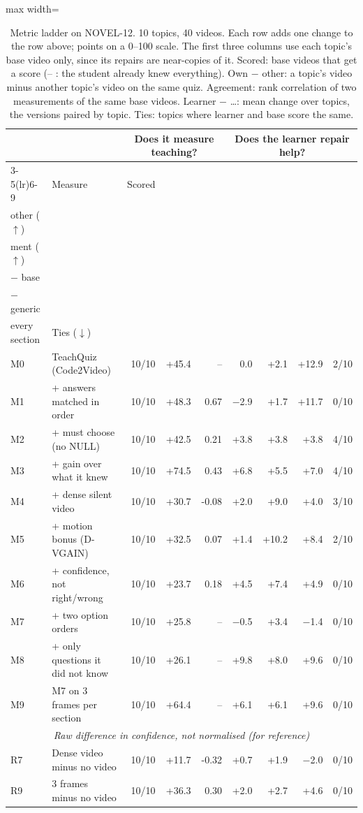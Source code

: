 \begin{table}[!tbp]\centering\footnotesize
\caption{Metric ladder on NOVEL-12. 10 topics, 40 videos. Each row adds one change to the row above; points on a 0--100 scale. The first three columns use each topic's base video only, since its repairs are near-copies of it. Scored: base videos that get a score (-- : the student already knew everything). Own $-$ other: a topic's video minus another topic's video on the same quiz. Agreement: rank correlation of two measurements of the same base videos. Learner $-$ \ldots: mean change over topics, the versions paired by topic. Ties: topics where learner and base score the same.}\label{tab:ladder_novel}
\setlength{\tabcolsep}{4pt}\begin{adjustbox}{max width=\linewidth}\begin{tabular}{@{}llrrrrrrr@{}}\toprule & & \multicolumn{3}{c}{Does it measure teaching?} & \multicolumn{4}{c}{Does the learner repair help?}\\
\cmidrule(lr){3-5}\cmidrule(lr){6-9}
& Measure & Scored & \hd{Own $-$\\other ($\uparrow$)} & \hd{Agree-\\ment ($\uparrow$)} & \hd{Learner\\$-$ base} & \hd{Learner\\$-$ generic} & \hd{Learner $-$\\every section} & Ties ($\downarrow$)\\\midrule
M0 & TeachQuiz (Code2Video) & 10/10 & +45.4 & -- & 0.0 & +2.1 & +12.9 & 2/10 \\
M1 & + answers matched in order & 10/10 & +48.3 & 0.67 & $-$2.9 & +1.7 & +11.7 & 0/10 \\
M2 & + must choose (no NULL) & 10/10 & +42.5 & 0.21 & +3.8 & +3.8 & +3.8 & 4/10 \\
M3 & + gain over what it knew & 10/10 & +74.5 & 0.43 & +6.8 & +5.5 & +7.0 & 4/10 \\
M4 & + dense silent video & 10/10 & +30.7 & -0.08 & +2.0 & +9.0 & +4.0 & 3/10 \\
M5 & + motion bonus (D-VGAIN) & 10/10 & +32.5 & 0.07 & +1.4 & +10.2 & +8.4 & 2/10 \\
M6 & + confidence, not right/wrong & 10/10 & +23.7 & 0.18 & +4.5 & +7.4 & +4.9 & 0/10 \\
M7 & + two option orders & 10/10 & +25.8 & -- & $-$0.5 & +3.4 & $-$1.4 & 0/10 \\
M8 & + only questions it did not know & 10/10 & +26.1 & -- & +9.8 & +8.0 & +9.6 & 0/10 \\
M9 & M7 on 3 frames per section & 10/10 & +64.4 & -- & +6.1 & +6.1 & +9.6 & 0/10 \\
\midrule
\multicolumn{9}{c}{\textit{Raw difference in confidence, not normalised (for reference)}}\\
R7 & Dense video minus no video & 10/10 & +11.7 & -0.32 & +0.7 & +1.9 & $-$2.0 & 0/10 \\
R9 & 3 frames minus no video & 10/10 & +36.3 & 0.30 & +2.0 & +2.7 & +4.6 & 0/10 \\
\bottomrule\end{tabular}\end{adjustbox}
\end{table}
